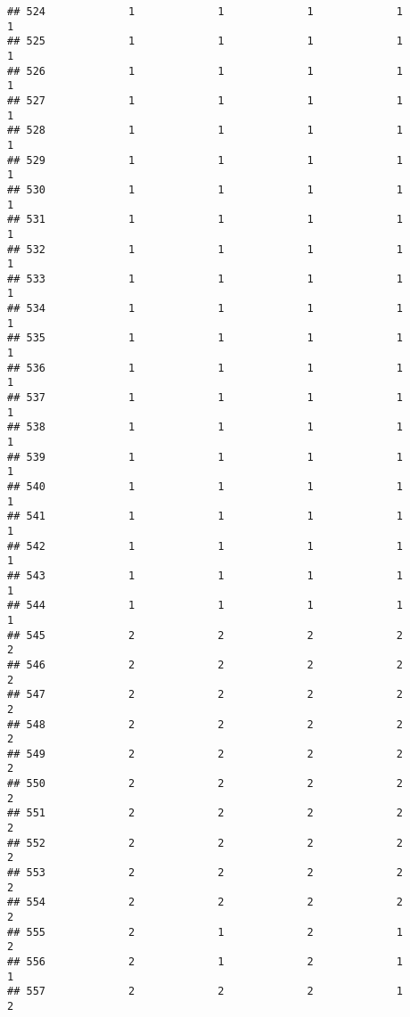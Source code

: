 \documentclass[
]{article}
\begin{document}
\begin{verbatim}
## 524             1             1             1             1             1
## 525             1             1             1             1             1
## 526             1             1             1             1             1
## 527             1             1             1             1             1
## 528             1             1             1             1             1
## 529             1             1             1             1             1
## 530             1             1             1             1             1
## 531             1             1             1             1             1
## 532             1             1             1             1             1
## 533             1             1             1             1             1
## 534             1             1             1             1             1
## 535             1             1             1             1             1
## 536             1             1             1             1             1
## 537             1             1             1             1             1
## 538             1             1             1             1             1
## 539             1             1             1             1             1
## 540             1             1             1             1             1
## 541             1             1             1             1             1
## 542             1             1             1             1             1
## 543             1             1             1             1             1
## 544             1             1             1             1             1
## 545             2             2             2             2             2
## 546             2             2             2             2             2
## 547             2             2             2             2             2
## 548             2             2             2             2             2
## 549             2             2             2             2             2
## 550             2             2             2             2             2
## 551             2             2             2             2             2
## 552             2             2             2             2             2
## 553             2             2             2             2             2
## 554             2             2             2             2             2
## 555             2             1             2             1             2
## 556             2             1             2             1             1
## 557             2             2             2             1             2

\end{verbatim}
\end{document}
